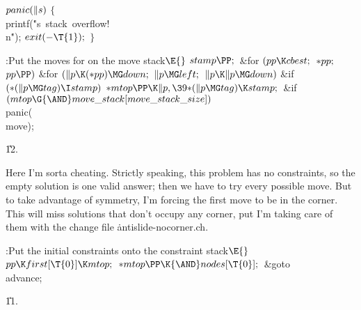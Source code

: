 \B\D$\\{panic}(\|s)$ \6
${}\{{}$\1\6
\\{printf}(\.{"s\ stack\ overflow!\\n}\)\.{"});\6
${}\\{exit}({-}\T{1});{}$\6
\4${}\}{}$\2\par
\Y\B\4:Put the moves for  on the move stack\X${}\E{}$\6
$\\{stamp}\PP;{}$\6
\&{for} ${}(\\{pp}\K\\{cbest};{}$ ${}{*}\\{pp};{}$ ${}\\{pp}\PP){}$\1\6
\&{for} ${}(\|p\K({*}\\{pp})\MG\\{down};{}$ ${}\|p\MG\\{left};{}$ ${}\|p\K\|p%
\MG\\{down}){}$\1\6
\&{if} ${}({*}(\|p\MG\\{tag})\I\\{stamp}){}$\1\5
${}{*}\\{mtop}\PP\K\|p,\39{*}(\|p\MG\\{tag})\K\\{stamp};{}$\2\2\2\6
\&{if} ${}(\\{mtop}\G{\AND}\\{move\_stack}[\\{move\_stack\_size}]){}$\1\5
\\{panic}(\\{move});\2\par
\U12.\fi

Here I'm sorta cheating. Strictly speaking, this problem has no
constraints, so the empty solution is one valid answer; then we have
to try every possible move. But to take advantage of symmetry, I'm
forcing the first move to be in the corner. This will miss solutions
that don't occupy any corner, put I'm taking care of them with
the change file \.{antislide-nocorner.ch}.

\Y\B\4:Put the initial constraints onto the constraint stack\X${}\E{}$\6
$\\{pp}\K\\{first}[\T{0}]\K\\{mtop};{}$\6
${}{*}\\{mtop}\PP\K{\AND}\\{nodes}[\T{0}];{}$\6
\&{goto} \\{advance};\par
\U11.\fi

